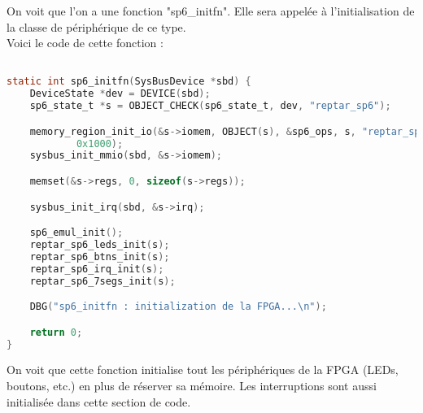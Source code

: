 On voit que l'on a une fonction "sp6\_initfn". Elle sera appelée à l'initialisation de la classe de périphérique de ce type.\\
\pagebreak
Voici le code de cette fonction :  
\begin{lstlisting}[language=C,caption=Device initialization]

static int sp6_initfn(SysBusDevice *sbd) {
	DeviceState *dev = DEVICE(sbd);
	sp6_state_t *s = OBJECT_CHECK(sp6_state_t, dev, "reptar_sp6");

	memory_region_init_io(&s->iomem, OBJECT(s), &sp6_ops, s, "reptar_sp6",
			0x1000);
	sysbus_init_mmio(sbd, &s->iomem);

	memset(&s->regs, 0, sizeof(s->regs));

	sysbus_init_irq(sbd, &s->irq);

	sp6_emul_init();
	reptar_sp6_leds_init(s);
	reptar_sp6_btns_init(s);
	reptar_sp6_irq_init(s);
	reptar_sp6_7segs_init(s);

	DBG("sp6_initfn : initialization de la FPGA...\n");

	return 0;
}
\end{lstlisting}

On voit que cette fonction initialise tout les périphériques de la FPGA (LEDs, boutons, etc.) en plus de réserver sa mémoire. Les interruptions sont aussi initialisée dans cette section de code.\\

